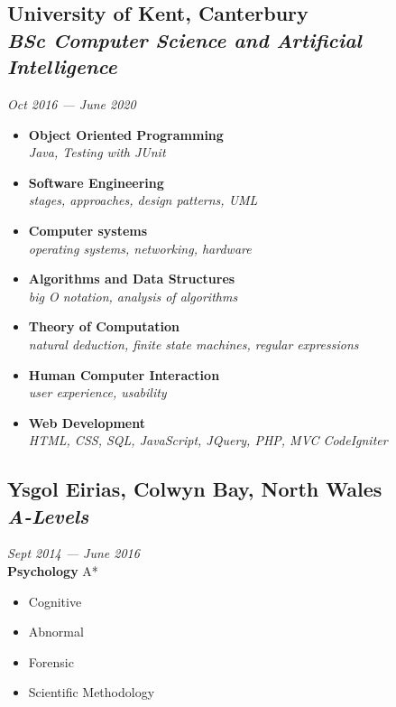 \documentclass[a4paper, 13pt, draft]{article}
\newcommand{\timeperiod}[2]{%
    \textit{\small{#1 --- #2}}
}
\begin{document}
    \begin{multicols}{2}

	\subsection*{University of Kent, \small{Canterbury}\\  
	\emph{BSc Computer Science and Artificial Intelligence}}

	\timeperiod{Oct 2016}{June 2020}

	\begin{itemize}[leftmargin=*]
	    \setlength\itemsep{0em}
	\item
	    \textbf{Object Oriented Programming} \\
	    \textit{Java, Testing with JUnit}
	\item
	    \textbf{Software Engineering} \\
	    \textit{stages, approaches, design patterns, UML}
	\item
	    \textbf{Computer systems} \\
	    \textit{operating systems, networking, hardware}
	\item
	    \textbf{Algorithms and Data Structures} \\
	    \textit{big O notation, analysis of algorithms}
	\item
	    \textbf{Theory of Computation} \\
	    \textit{natural deduction, finite state machines, regular expressions}
	\item
	    \textbf{Human Computer Interaction} \\
	    \textit{user experience, usability}
	\item
	    \textbf{Web Development} \\
	    \textit{HTML, CSS, SQL, JavaScript, JQuery, PHP, MVC CodeIgniter}
	    \\
    \end{itemize}

    \subsection*{Ysgol Eirias, \small{Colwyn Bay, North Wales} \\ \emph{A-Levels}}

    \timeperiod{Sept 2014}{June 2016} \\

    \textbf{Psychology} A*

    \begin{itemize}		
	\setlength\itemsep{0em}
    \item Cognitive
    \item Abnormal
    \item Forensic
    \item Scientific Methodology 
\end{itemize}		


\end{multicols}
\end{document}
